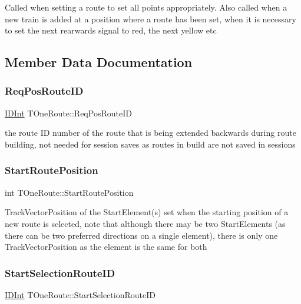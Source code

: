 Called when setting a route to set all points appropriately. Also called when a new train is added at a position where a route has been set, when it is necessary to set the next rearwards signal to red, the next yellow etc 

\subsection{Member Data Documentation}
\mbox{\label{class_t_one_route_aee7b2c91e9920bbb59c84cb562f0680a}} 
\subsubsection{\texorpdfstring{Req\+Pos\+Route\+ID}{ReqPosRouteID}}
{\footnotesize\ttfamily \mbox{\hyperlink{class_i_d_int}{I\+D\+Int}} T\+One\+Route\+::\+Req\+Pos\+Route\+ID}

the route ID number of the route that is being extended backwards during route building, not needed for session saves as routes in build are not saved in sessions \mbox{\label{class_t_one_route_a5b779b57f966fd9c7c7d1c42f8ecde22}} 
\subsubsection{\texorpdfstring{Start\+Route\+Position}{StartRoutePosition}}
{\footnotesize\ttfamily int T\+One\+Route\+::\+Start\+Route\+Position}

Track\+Vector\+Position of the Start\+Element(s) set when the starting position of a new route is selected, note that although there may be two Start\+Elements (as there can be two preferred directions on a single element), there is only one Track\+Vector\+Position as the element is the same for both \mbox{\label{class_t_one_route_a485b30c243956a400f658124d0f4ecd0}} 
\subsubsection{\texorpdfstring{Start\+Selection\+Route\+ID}{StartSelectionRouteID}}
{\footnotesize\ttfamily \mbox{\hyperlink{class_i_d_int}{I\+D\+Int}} T\+One\+Route\+::\+Start\+Selection\+Route\+ID}

